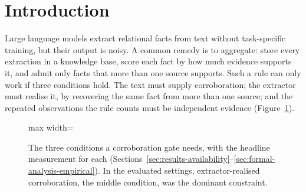 \documentclass[preprint,12pt,authoryear]{elsarticle}
\begin{document}
\section{Introduction}
\label{sec:introduction}

Large language models extract relational facts from text without
task-specific training, but their output is noisy. A common remedy is to
aggregate: store every extraction in a knowledge base, score each fact by
how much evidence supports it, and admit only facts that more than one
source supports. Such a rule can only work if three conditions hold. The
text must supply corroboration; the extractor must realise it, by
recovering the same fact from more than one source; and the repeated
observations the rule counts must be independent evidence
(Figure~\ref{fig:conditions}).

\begin{figure}[t]
\centering
\begin{adjustbox}{max width=\textwidth}
\end{adjustbox}
\caption{The three conditions a corroboration gate needs, with the
headline measurement for each
(Sections~\ref{sec:results-availability}--\ref{sec:formal-analysis-empirical}).
In the evaluated settings, extractor-realised corroboration, the middle
condition, was the dominant constraint.}
\label{fig:conditions}
\end{figure}
\end{document}
